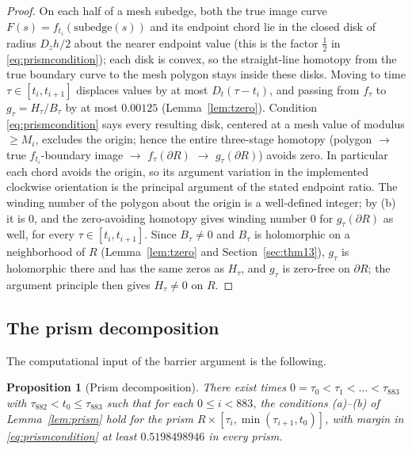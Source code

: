 \documentclass[11pt]{article}
\newtheorem{proposition}[theorem]{Proposition}
\theoremstyle{definition}
\begin{document}
\begin{proof}
On each half of a mesh subedge, both the true image curve
$F(s)=f_{t_i}(\text{subedge}(s))$ and its endpoint chord lie in the
closed disk of radius $D_{z}h/2$ about the nearer endpoint value
(this is the factor $\frac12$ in \eqref{eq:prismcondition}); each disk is
convex, so the straight-line homotopy from the true boundary curve
to the mesh polygon stays inside these disks. Moving to time
$\tau\in[t_i,t_{i+1}]$ displaces values by at most
$D_{t}(\tau-t_i)$, and passing from $f_\tau$ to
$g_\tau=H_\tau/B_\tau$ by at most $0.00125$
(Lemma~\ref{lem:tzero}). Condition \eqref{eq:prismcondition} says every
resulting disk, centered at a mesh value of modulus $\ge M_i$,
excludes the origin; hence the entire three-stage homotopy (polygon
$\to$ true $f_{t_i}$-boundary image $\to$ $f_\tau(\partial R)$ $\to$
$g_\tau(\partial R)$) avoids zero. In particular each chord avoids
the origin, so its argument variation in the implemented clockwise
orientation is the principal argument of the stated endpoint ratio. The
winding number of the polygon about the origin is a well-defined integer;
by (b) it is
$0$, and the zero-avoiding homotopy gives winding number $0$ for
$g_\tau(\partial R)$ as well, for every $\tau\in[t_i,t_{i+1}]$.
Since $B_\tau\neq0$ and $B_\tau$ is holomorphic on a neighborhood
of $R$ (Lemma~\ref{lem:tzero} and Section~\ref{sec:thm13}),
$g_\tau$ is holomorphic there and has the same zeros as $H_\tau$,
and $g_\tau$ is zero-free on $\partial R$; the argument principle
then gives $H_\tau\neq0$ on $R$.
\end{proof}

\subsection{The prism decomposition}\label{sec:prisms}

The computational input of the barrier argument is the following.

\begin{proposition}[Prism decomposition]\label{prop:prisms}
There exist times $0=\tau_0<\tau_1<\dots<\tau_{883}$ with
$\tau_{882}<t_0\le\tau_{883}$ such that for each $0\le i<883$, the
conditions (a)--(b) of Lemma~\ref{lem:prism} hold for the prism
$R\times[\tau_i,\min(\tau_{i+1},t_0)]$, with margin in
\eqref{eq:prismcondition} at least $0.5198498946$ in every prism.
\end{proposition}
\end{document}
